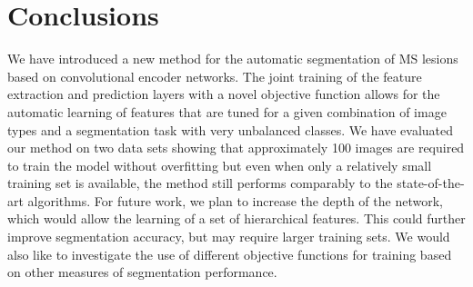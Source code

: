 \section{Conclusions}

We have introduced a new method for the automatic segmentation of MS lesions
based on convolutional encoder networks. The joint training of the feature
extraction and prediction layers with a novel objective function allows for the
automatic learning of features that are tuned for a given combination of image
types and a segmentation task with very unbalanced classes.
We have evaluated our method on two data sets showing that approximately 100
images are required to train the model without overfitting but even when only a
relatively small training set is available, the method still performs comparably
to the state-of-the-art algorithms. For future work, we plan to increase the
depth of the network, which would allow the learning of a set of hierarchical
features. This could further improve segmentation accuracy, but may require
larger training sets. We would also like to investigate the use of different
objective functions for training based on other measures of segmentation
performance.
